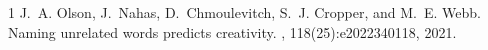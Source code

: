 \documentclass[11pt]{article}
\begin{document}

\begin{thebibliography}{1}
J.~A. Olson, J.~Nahas, D.~Chmoulevitch, S.~J. Cropper, and M.~E. Webb.
\newblock Naming unrelated words predicts creativity.
,
118(25):e2022340118, 2021.
\end{thebibliography}
\end{document}
